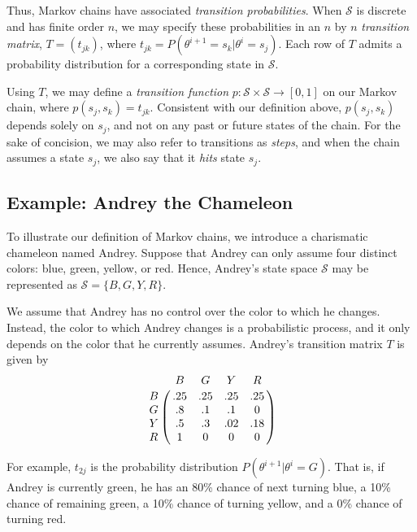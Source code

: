 \documentclass[12pt,twoside]{reedthesis}
\begin{document}
			Thus, Markov chains have associated {\em transition probabilities}. When $\mathcal S$ is discrete and has finite order $n$, we may specify these probabilities in an $n$ by $n$ {\em transition matrix}, $T = (t_{jk})$, where $t_{jk} = P(\theta^{i+1} = s_k | \theta^{i} = s_j)$. Each row of $T$ admits a probability distribution for a corresponding state in $\mathcal S$. 
			
			Using $T$, we may define a {\em transition function} $p: \mathcal{S}\times\mathcal{S} \rightarrow [0,1]$ on our Markov chain, where $p(s_j,s_k) = t_{jk}$. Consistent with our definition above, $p(s_j,s_k)$ depends solely on $s_j$, and not on any past or future states of the chain. For the sake of concision, we may also refer to transitions as {\em steps}, and when the chain assumes a state $s_j$, we also say that it {\em hits} state $s_j$. 
			
	 
	\subsection*{Example: Andrey the Chameleon}
	To illustrate our definition of Markov chains, we introduce a charismatic chameleon named Andrey. 
	Suppose that Andrey can only assume four distinct colors: blue, green, yellow, or red. Hence, Andrey's state space $\mathcal S$ may be represented as $\mathcal{S} = \{B, G, Y, R\}$. 
	
	We assume that Andrey has no control over the color to which he changes. Instead, the color to which Andrey changes is a probabilistic process, and it only depends on the color that he currently assumes. Andrey's transition matrix $T$ is given by
$$
\bordermatrix{ ~ & B & G & Y & R \cr
	                     B & .25 & .25 & .25 & .25 \cr
	                     G & .8 & .1 & .1 & 0 \cr
	                     Y & .5 & .3 & .02 & .18 \cr
	                     R & 1 & 0 & 0 & 0 \cr	                     	                     	                     
}
$$
	
	For example, $t_{2j}$ is the probability distribution $P(\theta^{i+1} | \theta^i = G)$. That is, if Andrey is currently green, he has an 80\% chance of next turning blue, a 10\% chance of remaining green, a 10\% chance of turning yellow, and a 0\% chance of turning red. 
	
\end{document}

